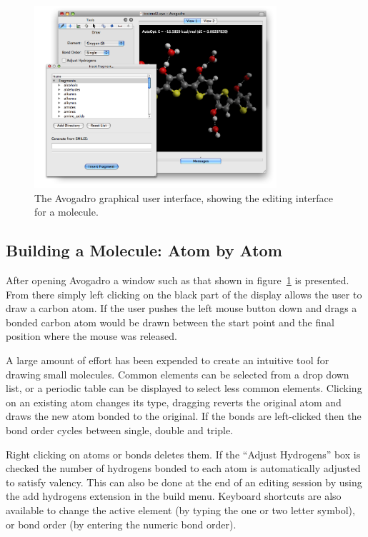 \documentclass[10pt]{bmc_article}
\newenvironment{bmcformat}{\begin{raggedright}
\baselineskip20pt\sloppy\setboolean{publ}{false}}{\end{raggedright}
\baselineskip20pt\sloppy}
\begin{document}
\begin{bmcformat}
\begin{figure}
  \begin{center}
    \includegraphics[width=0.8\textwidth]{images/avogadro-drawing}
  \end{center}
  \caption{The Avogadro graphical user interface, showing the editing interface
for a molecule.}
  \label{f:avogadrogui}
\end{figure}


\subsection{Building a Molecule: Atom by Atom}

After opening Avogadro a window such as that shown in figure~\ref{f:avogadrogui}
is presented. From there simply left clicking on the black part of the display
allows the user to draw a carbon atom. If the user pushes the left mouse button
down and drags a bonded carbon atom would be drawn between the start point and
the final position where the mouse was released.

A large amount of effort has been expended to create an intuitive tool for
drawing small molecules. Common elements can be selected from a drop down list,
or a periodic table can be displayed to select less common elements. Clicking on
an existing atom changes its type, dragging reverts the original atom and draws
the new atom bonded to the original. If the bonds are left-clicked then the bond
order cycles between single, double and triple.

Right clicking on atoms or bonds deletes them. If the ``Adjust Hydrogens'' box
is checked the number of hydrogens bonded to each atom is automatically adjusted
to satisfy valency. This can also be done at the end of an editing session by
using the add hydrogens extension in the build menu. Keyboard shortcuts are also
available to change the active element (by typing the one or two letter symbol),
or bond order (by entering the numeric bond order).


\end{bmcformat}
\end{document}
